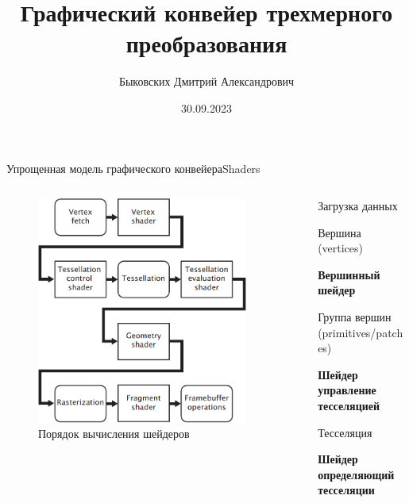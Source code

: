 \documentclass{beamer}
\title[Графический конвейер]{Графический конвейер трехмерного преобразования}
\author[Быковских Д.А.]{Быковских Дмитрий Александрович}
\date{30.09.2023}
\begin{document}
	\begin{frame}
		\titlepage
	\end{frame}
	
	\begin{frame}{Упрощенная модель графического конвейера}{Shaders}
		\begin{columns}
			\begin{column}{0.5\textwidth}
				\begin{figure} 
					\includegraphics[width=0.9\textwidth]{images/Simplified_model_of_the_graphics_pipeline.png}
					\caption {Порядок вычисления шейдеров}
				\end{figure}
			\end{column}
			\begin{column}{0.5\textwidth}
				
				{\footnotesize
				
				Загрузка данных
				
				{\hfill Вершина (vertices)}
				
				\textbf{Вершинный шейдер}
				
				{\hfill Группа вершин (primitives/patches)}
				
				\textbf{Шейдер управление тесселяцией}
				
				Тесселяция
				
				\textbf{Шейдер определяющий тесселяции}
				
}
\end{column}
\end{columns}
\end{frame}
\end{document}
